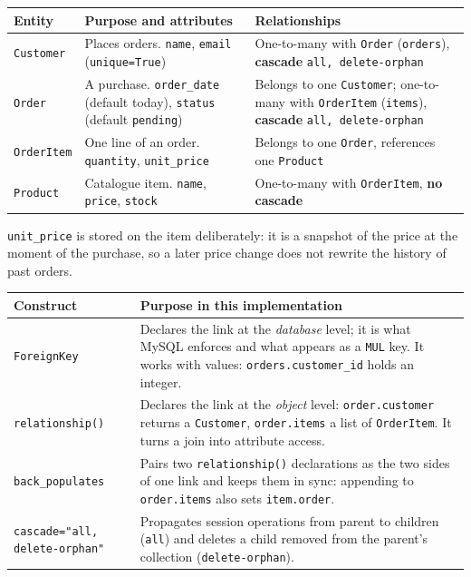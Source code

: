\documentclass[10pt,a4paper]{article}
\begin{document}
\begin{table}[H]
\centering\footnotesize
\begin{tabular}{@{}p{2.1cm}p{5.4cm}p{8.2cm}@{}}
\toprule
\textbf{Entity} & \textbf{Purpose and attributes} & \textbf{Relationships} \\
\midrule
\texttt{Customer} & Places orders. \texttt{name}, \texttt{email}
(\texttt{unique=True}) &
One-to-many with \texttt{Order} (\texttt{orders}), \textbf{cascade}
\texttt{all, delete-orphan} \\
\addlinespace
\texttt{Order} & A purchase. \texttt{order\_date} (default today),
\texttt{status} (default \texttt{pending}) &
Belongs to one \texttt{Customer}; one-to-many with \texttt{OrderItem}
(\texttt{items}), \textbf{cascade} \texttt{all, delete-orphan} \\
\addlinespace
\texttt{OrderItem} & One line of an order. \texttt{quantity},
\texttt{unit\_price} &
Belongs to one \texttt{Order}, references one \texttt{Product} \\
\addlinespace
\texttt{Product} & Catalogue item. \texttt{name}, \texttt{price},
\texttt{stock} &
One-to-many with \texttt{OrderItem}, \textbf{no cascade} \\
\bottomrule
\end{tabular}
\end{table}

\texttt{unit\_price} is stored on the item deliberately: it is a snapshot of the
price at the moment of the purchase, so a later price change does not rewrite
the history of past orders.

\begin{table}[H]
\centering\footnotesize
\begin{tabular}{@{}p{3.2cm}p{12.6cm}@{}}
\toprule
\textbf{Construct} & \textbf{Purpose in this implementation} \\
\midrule
\texttt{ForeignKey} & Declares the link at the \emph{database} level; it is what
MySQL enforces and what appears as a \texttt{MUL} key. It works with values:
\texttt{orders.customer\_id} holds an integer. \\
\texttt{relationship()} & Declares the link at the \emph{object} level:
\texttt{order.customer} returns a \texttt{Customer}, \texttt{order.items} a list
of \texttt{OrderItem}. It turns a join into attribute access. \\
\texttt{back\_populates} & Pairs two \texttt{relationship()} declarations as the
two sides of one link and keeps them in sync: appending to \texttt{order.items}
also sets \texttt{item.order}. \\
\texttt{cascade="all,} \texttt{delete-orphan"} & Propagates session operations
from parent to children (\texttt{all}) and deletes a child removed from the
parent's collection (\texttt{delete-orphan}). \\
\bottomrule
\end{tabular}
\end{table}
\end{document}
